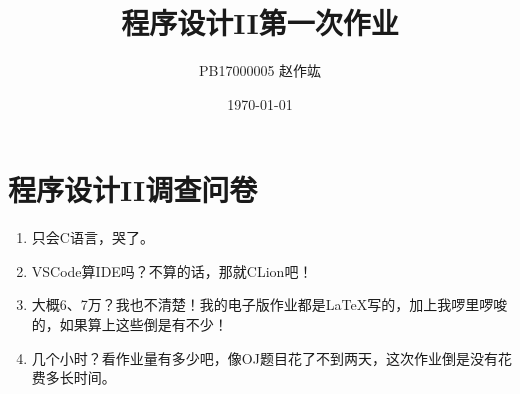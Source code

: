 \documentclass[UTF8,zihao=-4]{ctexart}
\title{\heiti 程序设计II\quad 第一次作业}
\author{PB17000005\quad \CJKfontspec{AR PL UKai CN} 赵作竑}
\date{\kaishu \today}
\begin{document}
    \maketitle
    \section*{程序设计II调查问卷}
    \begin{enumerate}
        \item 只会C语言，哭了。
        \item VSCode算IDE吗？不算的话，那就CLion吧！
        \item 大概6、7万？我也不清楚！我的电子版作业都是\LaTeX 写的，加上我啰里啰唆的，如果算上这些倒是有不少！
        \item 几个小时？看作业量有多少吧，像OJ题目花了不到两天，这次作业倒是没有花费多长时间。
    \end{enumerate}
\end{document}
